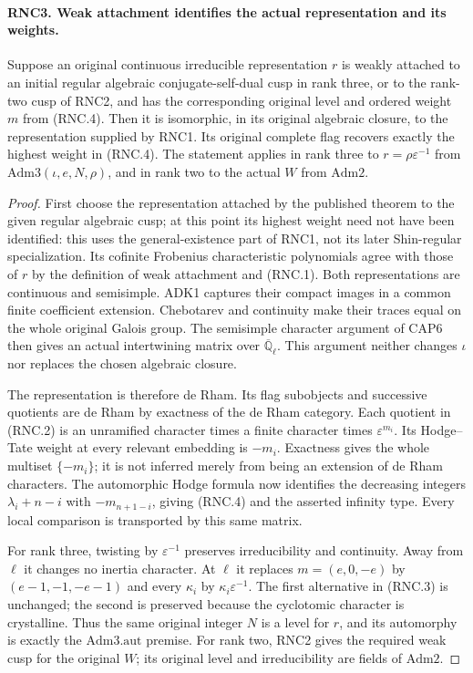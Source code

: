 \documentclass[11pt,a4paper]{article}
\numberwithin{equation}{section}
\theoremstyle{remark}\newtheorem{remark}[theorem]{Remark}
\begin{document}
\paragraph{RNC3. Weak attachment identifies the actual representation and its weights.}
\label{claim:RNC3}
Suppose an original continuous irreducible representation $r$
is weakly attached to an initial regular algebraic
conjugate-self-dual cusp in rank three, or to the rank-two
cusp of RNC2, and has the corresponding original level
and ordered weight $m$ from (RNC.4).  Then it
is isomorphic, in its original algebraic closure, to the
representation supplied by RNC1.  Its original complete flag
recovers exactly the highest weight in (RNC.4).  The statement
applies in rank three to $r=\rho\varepsilon^{-1}$ from
$\mathrm{Adm3}(\iota,e,N,\rho)$, and in rank two to the
actual $W$ from $\mathrm{Adm2}$.
\begin{proof}
First choose the representation attached by the published
theorem to the given regular algebraic cusp; at this point its
highest weight need not have been identified: this uses
the general-existence part of RNC1, not its later Shin-regular
specialization.  Its cofinite
Frobenius characteristic polynomials agree with those of $r$
by the definition of weak attachment and (RNC.1).
Both representations are continuous and semisimple.  ADK1
captures their compact images in a common finite coefficient
extension.  Chebotarev and continuity make their traces equal
on the whole original Galois group.  The semisimple character
argument of CAP6 then gives an actual intertwining matrix over
$\overline{\mathbb Q}_\ell$.  This argument neither changes
$\iota$ nor replaces the chosen algebraic closure.

The representation is therefore de Rham.  Its flag subobjects
and successive quotients are de Rham by exactness of the
de Rham category.  Each quotient in (RNC.2) is an unramified
character times a finite character times
$\varepsilon^{m_i}$.  Its Hodge--Tate weight at every relevant
embedding is $-m_i$.  Exactness gives the whole multiset
$\{-m_i\}$; it is not inferred merely from being an extension
of de Rham characters.  The automorphic Hodge formula now
identifies the decreasing integers $\lambda_i+n-i$ with
$-m_{n+1-i}$, giving (RNC.4) and the asserted infinity type.
Every local comparison is transported by this same matrix.

For rank three, twisting by $\varepsilon^{-1}$ preserves
irreducibility and continuity.  Away from $\ell$ it changes
no inertia character.  At $\ell$ it replaces $m=(e,0,-e)$
by $(e-1,-1,-e-1)$ and every $\kappa_i$ by
$\kappa_i\varepsilon^{-1}$.  The first alternative in
(RNC.3) is unchanged; the second is preserved because the
cyclotomic character is crystalline.  Thus the same original
integer $N$ is a level for $r$, and its automorphy is exactly
the $\mathrm{Adm3.aut}$ premise.  For rank two, RNC2 gives
the required weak cusp for the original $W$; its original
level and irreducibility are fields of $\mathrm{Adm2}$.
\end{proof}
\end{document}
